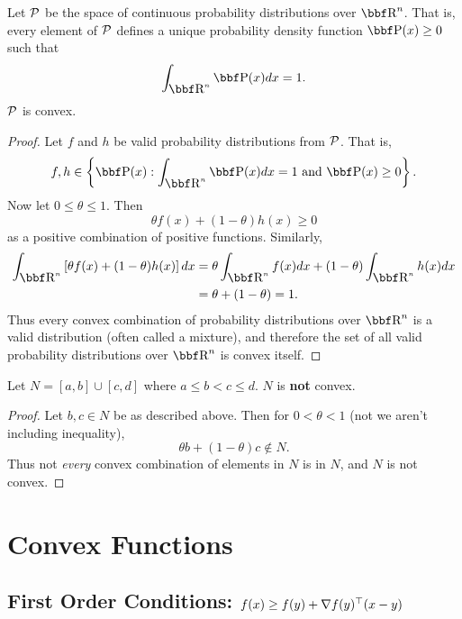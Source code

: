 \documentclass{article}
\begin{document}
\begin{example}
    Let ${\cal P}$ be the space of continuous probability distributions over
    $\RR^n$. That is, every element of ${\cal P}$ defines a unique probability
    density function $\PP(x) \geq 0$ such that \[\int_{\RR^n} \PP(x) dx=1.\]
    ${\cal P}$ is convex.
\end{example}
\begin{proof}
    Let $f$ and $h$ be valid probability distributions from ${\cal P}$. That is,
    \[
        f,h \in \left\{\PP(x) : \int_{\RR^n} \PP(x)dx = 1 \text{ and } \PP(x) \geq 0 \right\}.
    \]
    Now let $0\leq\theta\leq1$. Then
    \[
        \theta f(x) + (1-\theta) h(x) \geq 0
    \]
    as a positive combination of positive functions. Similarly,
    \begin{align*}
        \int_{\RR^n}\left[ \theta f(x) + (1-\theta) h(x) \right]dx &= \theta\int_{\RR^n}f(x)dx + (1-\theta)\int_{\RR^n}h(x)dx\\
        &= \theta + (1-\theta) = 1.
    \end{align*}
    Thus every convex combination of probability distributions over $\RR^n$ is
    a valid distribution (often called a mixture), and therefore the set of
    all valid probability distributions over $\RR^n$ is convex itself.
\end{proof}

\begin{example}
    Let $N = [a,b] \cup [c,d]$ where $a\leq b < c \leq d$.
    $N$ is \textbf{not} convex.
\end{example}
\begin{proof}
    Let $b,c\in N$ be as described above. Then for $0<\theta<1$
    (not we aren't including inequality),
    \[
        \theta b + (1-\theta)c \not\in N.
    \]
    Thus not \textit{every} convex combination of elements in
    $N$ is in $N$, and $N$ is not convex.
\end{proof}

\section{Convex Functions}

\subsection{First Order Conditions: $f(x) \geq f(y) + \nabla f(y)^\top (x-y)$}
\end{document}
